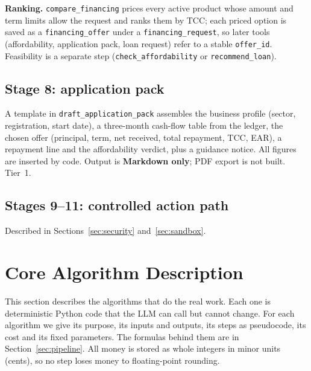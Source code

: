 \documentclass[10pt,a4paper]{article}
\newcommand{\code}[1]{\texttt{\small #1}}
\begin{document}
\textbf{Ranking.} \code{compare\_financing} prices every active product whose amount and term limits allow the request and ranks them by TCC; each priced option is saved as a \code{financing\_offer} under a \code{financing\_request}, so later tools (affordability, application pack, loan request) refer to a stable \code{offer\_id}. Feasibility is a separate step (\code{check\_affordability} or \code{recommend\_loan}).

\subsection{Stage 8: application pack}
A template in \code{draft\_application\_pack} assembles the business profile (sector, registration, start date), a three-month cash-flow table from the ledger, the chosen offer (principal, term, net received, total repayment, TCC, EAR), a repayment line and the affordability verdict, plus a guidance notice. All figures are inserted by code. Output is \textbf{Markdown only}; PDF export is not built. Tier~1.

\subsection{Stages 9--11: controlled action path}
Described in Sections~\ref{sec:security} and~\ref{sec:sandbox}.

\section{Core Algorithm Description}
\label{sec:algorithms}

This section describes the algorithms that do the real work. Each one is deterministic Python code that the LLM can call but cannot change. For each algorithm we give its purpose, its inputs and outputs, its steps as pseudocode, its cost and its fixed parameters. The formulas behind them are in Section~\ref{sec:pipeline}. All money is stored as whole integers in minor units (cents), so no step loses money to floating-point rounding.
\end{document}
